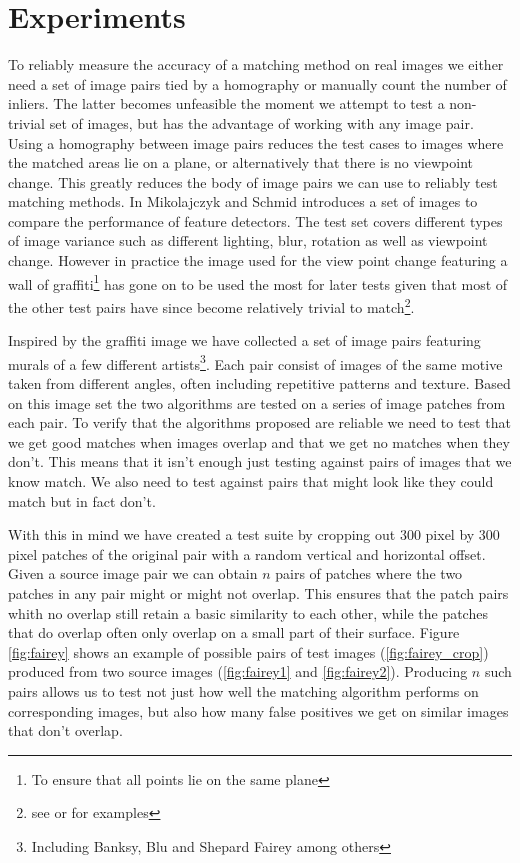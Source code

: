 \documentclass{article}
\begin{document}
\section{Experiments}
\label{experiment}

To reliably measure the accuracy of a matching method on real images we 
either need a set of image pairs tied by a homography or manually count 
the number of inliers. The latter becomes unfeasible the moment we 
attempt to test a non-trivial set of images, but has the advantage of 
working with any image pair. Using a homography between image pairs 
reduces the test cases to images where the matched areas lie on a plane, 
or alternatively that there is no viewpoint change. This greatly reduces 
the body of image pairs we can use to reliably test matching methods. In 
\cite{mikolaczyk2005performance} Mikolajczyk and Schmid introduces a set 
of images to compare the performance of feature detectors. The test set 
covers different types of image variance such as different lighting, 
blur, rotation as well as viewpoint change.  However in practice the 
image used for the view point change featuring a wall of 
graffiti\footnote{To ensure that all points lie on the same plane} has 
gone on to be used the most for later tests given that most of the other 
test pairs have since become relatively trivial to match\footnote{see 
\cite{wu2011robust} or \cite{delponte2006svd} for examples}.

Inspired by the graffiti image we have collected a set of image pairs 
featuring murals of a few different artists\footnote{Including Banksy, 
Blu and Shepard Fairey among others}. Each pair consist of images of the 
same motive taken from different angles, often including repetitive 
patterns and texture. Based on this image set the two algorithms are 
tested on a series of image patches from each pair. To verify that the 
algorithms proposed are reliable we need to test that we get good 
matches when images overlap and that we get no matches when they don't.  
This means that it isn't enough just testing against pairs of images 
that we know match.  We also need to test against pairs that might look 
like they could match but in fact don't.

With this in mind we have created a test suite by cropping out $300$ 
pixel by $300$ pixel patches of the original pair with a random vertical 
and horizontal offset. Given a source image pair we can obtain $n$ pairs 
of patches where the two patches in any pair might or might not overlap.  
This ensures that the patch pairs whith no overlap still retain a basic 
similarity to each other, while the patches that do overlap often only 
overlap on a small part of their surface. Figure \ref{fig:fairey} shows 
an example of possible pairs of test images (\ref{fig:fairey_crop}) 
produced from two source images (\ref{fig:fairey1} and 
\ref{fig:fairey2}). Producing $n$ such pairs allows us to test not just 
how well the matching algorithm performs on corresponding images, but 
also how many false positives we get on similar images that don't 
overlap.
\end{document}

